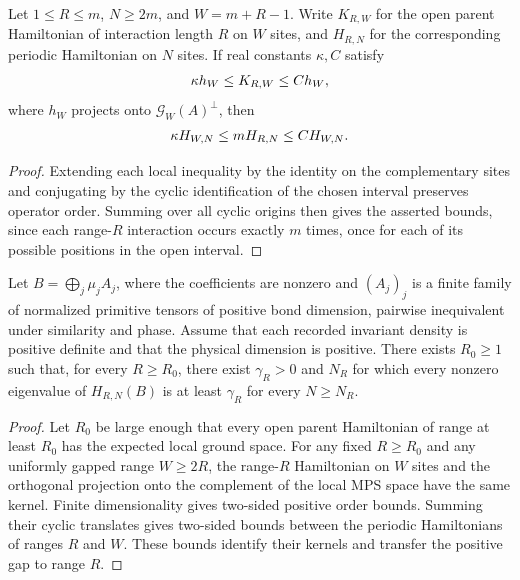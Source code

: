 \begin{lemma}
    \label{thm:periodic-parent-range-comparison}
    \leanok
    Let $1\leq R\leq m$, $N\geq 2m$, and $W=m+R-1$.
    Write $K_{R,W}$ for the open parent Hamiltonian of interaction length
    $R$ on $W$ sites, and $H_{R,N}$ for the corresponding periodic
    Hamiltonian on $N$ sites. If real constants $\kappa,C$ satisfy
    \begin{align}
        \kappa h_W\leq K_{R,W}\leq C h_W,
        \notag
    \end{align}
    where $h_W$ projects onto $\mathcal G_W(A)^\perp$, then
    \begin{align}
        \kappa H_{W,N}\leq mH_{R,N}\leq C H_{W,N}.
        \notag
    \end{align}
\end{lemma}
\begin{proof}\leanok
    Extending each local inequality by the identity on the complementary sites
    and conjugating by the cyclic identification of the chosen interval
    preserves operator order. Summing over all cyclic origins then gives the
    asserted bounds, since each range-$R$ interaction occurs
    exactly $m$ times, once for each of its possible positions in the
    open interval.
\end{proof}

\begin{lemma}
    \label{thm:primitive_block_sum_parent_gap_threshold}
    \leanok
    Let $B=\bigoplus_j\mu_j A_j$, where the coefficients are nonzero and
    $(A_j)_j$ is a finite family of normalized primitive tensors of positive
    bond dimension, pairwise inequivalent under similarity and phase. Assume that
    each recorded invariant density is positive definite and that the physical
    dimension is positive. There exists $R_0\geq1$ such that, for every
    $R\geq R_0$, there exist $\gamma_R>0$ and $N_R$ for which every nonzero
    eigenvalue of $H_{R,N}(B)$ is at least $\gamma_R$ for every
    $N\geq N_R$.
\end{lemma}
\begin{proof}\leanok
    Let $R_0$ be large enough that every open parent Hamiltonian of range at
    least $R_0$ has the expected local ground space. For any fixed $R\geq R_0$
    and any uniformly gapped range $W\geq2R$, the range-$R$ Hamiltonian on $W$
    sites and the orthogonal projection onto the complement of the local
    MPS space have the same kernel. Finite dimensionality gives two-sided
    positive order bounds. Summing their cyclic translates gives two-sided
    bounds between the periodic Hamiltonians of ranges $R$ and $W$.
    These bounds identify their kernels and transfer the positive gap to range
    $R$.
\end{proof}

